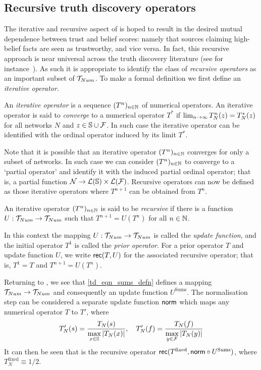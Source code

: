\subsection{Recursive truth discovery operators}
\label{td_sec_recursive_truth_discovery_operators}

The iterative and recursive aspect of \sums{} is hoped to result in the desired
mutual dependence between trust and belief scores: namely that sources claiming
high-belief facts are seen as trustworthy, and vice versa. In fact, this
recursive approach is near universal across the truth discovery literature (see
for
instance~\cite{yang_probabilistic_2019,du2019,zhang2018,li2016,galland2010,zhi2015}).
As such it is appropriate to identify the class of \emph{recursive operators}
as an important subset of $\mathcal{T}_{Num}$. To make a formal definition we first define
an \emph{iterative operator}.

\begin{definition}
An \emph{iterative operator} is a sequence $(T^n)_{n \in \mathbb{N}}$ of numerical
operators. An iterative operator is said to \emph{converge} to a numerical
operator $T^*$ if $\lim_{n \to \infty}{T_N^n(z)}=T_N^*(z)$ for all networks $N$ and $z \in \mathbb{S}
\cup \mathcal{F}$. In such case the iterative operator can be identified with the
ordinal operator induced by its limit $T^*$.
\end{definition}

Note that it is possible that an iterative operator $(T^n)_{n \in \mathbb{N}}$
converges for only a subset of networks. In such case we can consider
$(T^n)_{n \in \mathbb{N}}$ to converge to a `partial operator' and identify it with
the induced partial ordinal operator; that is, a partial function $\mathcal{N} \to
\mathcal{L}(\mathbb{S}) \times \mathcal{L}(\mathcal{F})$.
%
Recursive operators can now be defined as those iterative operators where
$T^{n+1}$ can be obtained from $T^n$.

\begin{definition}
An iterative operator $(T^n)_{n \in \mathbb{N}}$ is said to be \emph{recursive} if
there is a function $U: \mathcal{T}_{Num} \to \mathcal{T}_{Num}$ such that $T^{n+1} = U(T^n)$ for all $n
\in \mathbb{N}$.
\end{definition}

In this context the mapping $U: \mathcal{T}_{Num} \to \mathcal{T}_{Num}$ is called the \emph{update
function}, and the initial operator $T^1$ is called the \emph{prior operator}.
For a prior operator $T$ and update function $U$, we write $\mathsf{rec}(T, U)$ for the
associated recursive operator; that is, $T^1 = T$ and $T^{n+1}=U(T^n)$.

Returning to \sums{}, we see that \cref{td_eqn_sums_defn} defines a mapping $\mathcal{T}_{Num}
\to \mathcal{T}_{Num}$ and consequently an update function $U^{\text{Sums}}$. The
normalisation step can be considered a separate update function $\mathsf{norm}$ which
maps any numerical operator $T$ to $T'$, where\footnotemark
\[
    T_N'(s) = \frac{T_N(s)}{\max\limits_{x \in \mathbb{S}}{|T_N(x)|}}, \quad
    T_N'(f) = \frac{T_N(f)}{\max\limits_{y \in \mathcal{F}}{|T_N(y)|}}
\]
%
It can then be seen that \sums{} is the recursive operator
$\mathsf{rec}(T^{\text{fixed}},
\mathsf{norm} \circ U^{\text{Sums}})$, where $T^{\text{fixed}}_N \equiv 1/2$.

